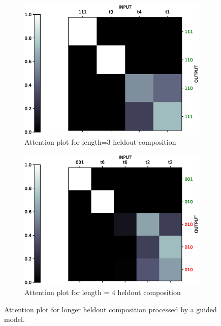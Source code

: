 \begin{figure}[H] 
	\begin{subfigure}[b]{0.5\linewidth}
		\centering
		\includegraphics[width=0.95\linewidth]{./figs/lookup/attn/longer2-eps}
		\caption{Attention plot for length=3 heldout composition} 
		\label{attn_longer1} 
		\vspace{2ex}
	\end{subfigure}%
	\begin{subfigure}[b]{0.5\linewidth}
		\centering
		\includegraphics[width=0.95\linewidth]{./figs/lookup/attn/longer1-eps}
		\caption{Attention plot for length = 4 heldout composition} 
		\label{attn_longer2} 
		\vspace{2ex}
	\end{subfigure}
	\caption{Attention plot for longer heldout composition processed by a guided model.}
	\label{attn_longer}
\end{figure}

